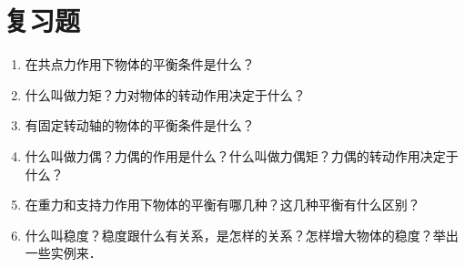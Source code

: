 \section*{复习题}
\begin{enumerate}
	\item 在共点力作用下物体的平衡条件是什么？
	\item 什么叫做力矩？力对物体的转动作用决定于什么？
	\item 有固定转动轴的物体的平衡条件是什么？
	\item 什么叫做力偶？力偶的作用是什么？什么叫做力偶矩？力偶的转动作用决定于什么？
	\item 在重力和支持力作用下物体的平衡有哪几种？这几种平衡有什么区别？
	\item 什么叫稳度？稳度跟什么有关系，是怎样的关系？怎样增大物体的稳度？举出一些实例来．
\end{enumerate}
\newpage
